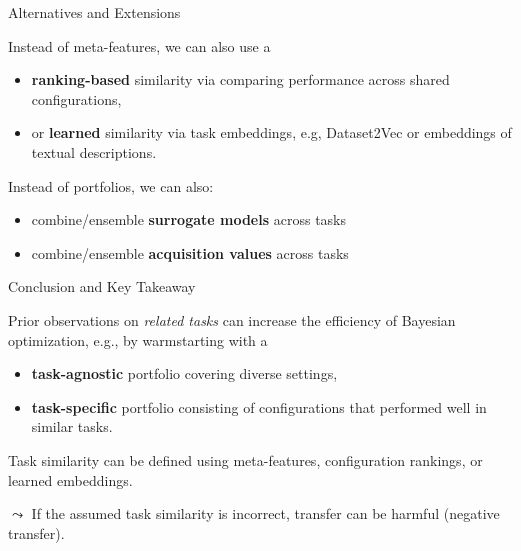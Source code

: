 \documentclass[main]{subfiles}
\begin{document}
\begin{frame}{Alternatives and Extensions}

Instead of meta-features, we can also use a
\begin{itemize}
    \item \textbf{ranking-based} similarity via comparing performance across shared configurations,
    \item or \textbf{learned} similarity via task embeddings, e.g, Dataset2Vec  or embeddings of textual descriptions.
\end{itemize}

\pause
\vspace{0.5cm}
Instead of portfolios, we can also:
\begin{itemize}
    \item combine/ensemble \textbf{surrogate models} across tasks
    \item combine/ensemble \textbf{acquisition values} across tasks
\end{itemize}
\end{frame}
\begin{frame}{Conclusion and Key Takeaway}

Prior observations on \emph{related tasks} can increase the efficiency of Bayesian optimization, e.g., by warmstarting with a
\begin{itemize}
    \item \textbf{task-agnostic} portfolio covering diverse settings,
    \item \textbf{task-specific} portfolio consisting of configurations that performed well in similar tasks.
\end{itemize}
Task similarity can be defined using meta-features, configuration rankings, or learned embeddings.
\pause
\vspace{0.5cm}

$\leadsto$ If the assumed task similarity is incorrect, transfer can be harmful (negative transfer).

\end{frame}
\end{document}
